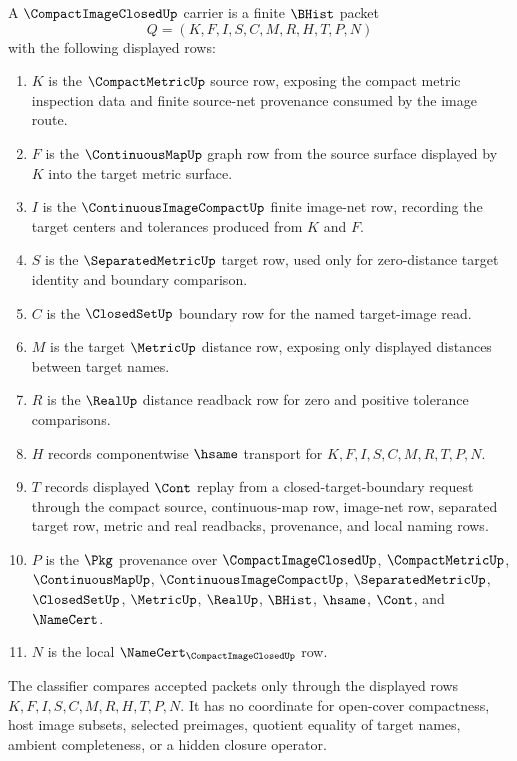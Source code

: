 \begin{definition}
\label{def:compact-image-closed-carrier}
A $\CompactImageClosedUp$ carrier is a finite $\BHist$ packet
$$
Q=(K,F,I,S,C,M,R,H,T,P,N)
$$
with the following displayed rows:
\begin{enumerate}
\item $K$ is the $\CompactMetricUp$ source row, exposing the compact metric inspection data and finite source-net provenance consumed by the image route.
\item $F$ is the $\ContinuousMapUp$ graph row from the source surface displayed by $K$ into the target metric surface.
\item $I$ is the $\ContinuousImageCompactUp$ finite image-net row, recording the target centers and tolerances produced from $K$ and $F$.
\item $S$ is the $\SeparatedMetricUp$ target row, used only for zero-distance target identity and boundary comparison.
\item $C$ is the $\ClosedSetUp$ boundary row for the named target-image read.
\item $M$ is the target $\MetricUp$ distance row, exposing only displayed distances between target names.
\item $R$ is the $\RealUp$ distance readback row for zero and positive tolerance comparisons.
\item $H$ records componentwise $\hsame$ transport for $K,F,I,S,C,M,R,T,P,N$.
\item $T$ records displayed $\Cont$ replay from a closed-target-boundary request through the compact source, continuous-map row, image-net row, separated target row, metric and real readbacks, provenance, and local naming rows.
\item $P$ is the $\Pkg$ provenance over $\CompactImageClosedUp$, $\CompactMetricUp$, $\ContinuousMapUp$, $\ContinuousImageCompactUp$, $\SeparatedMetricUp$, $\ClosedSetUp$, $\MetricUp$, $\RealUp$, $\BHist$, $\hsame$, $\Cont$, and $\NameCert$.
\item $N$ is the local $\NameCert_{\CompactImageClosedUp}$ row.
\end{enumerate}
The classifier compares accepted packets only through the displayed rows $K,F,I,S,C,M,R,H,T,P,N$. It has no coordinate for open-cover compactness, host image subsets, selected preimages, quotient equality of target names, ambient completeness, or a hidden closure operator.
\end{definition}

